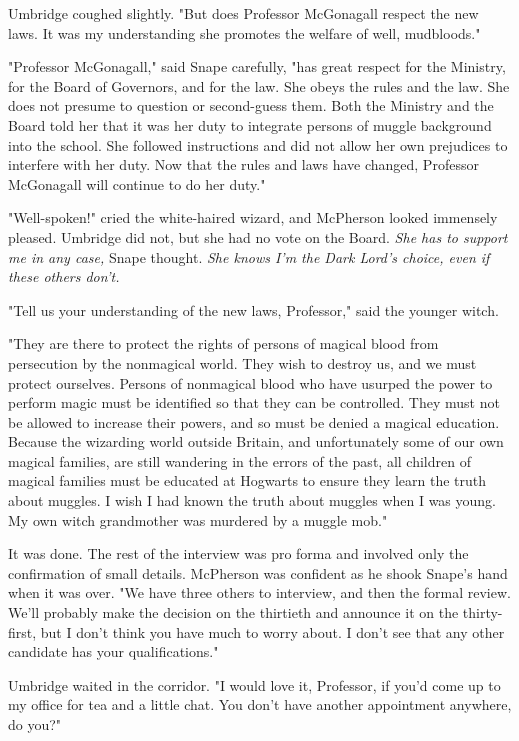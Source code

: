 Umbridge coughed slightly. "But does Professor McGonagall respect the new laws. It was my understanding she promotes the welfare of{\el} well, mudbloods."

"Professor McGonagall," said Snape carefully, "has great respect for the Ministry, for the Board of Governors, and for the law. She obeys the rules and the law. She does not presume to question or second-guess them. Both the Ministry and the Board told her that it was her duty to integrate persons of muggle background into the school. She followed instructions and did not allow her own prejudices to interfere with her duty. Now that the rules and laws have changed, Professor McGonagall will continue to do her duty."

"Well-spoken!" cried the white-haired wizard, and McPherson looked immensely pleased. Umbridge did not, but she had no vote on the Board. \emph{She has to support me in any case,} Snape thought. \emph{She knows I'm the Dark Lord's choice, even if these others don't.}

"Tell us your understanding of the new laws, Professor," said the younger witch.

"They are there to protect the rights of persons of magical blood from persecution by the nonmagical world. They wish to destroy us, and we must protect ourselves. Persons of nonmagical blood who have usurped the power to perform magic must be identified so that they can be controlled. They must not be allowed to increase their powers, and so must be denied a magical education. Because the wizarding world outside Britain, and unfortunately some of our own magical families, are still wandering in the errors of the past, all children of magical families must be educated at Hogwarts to ensure they learn the truth about muggles. I wish I had known the truth about muggles when I was young. My own witch grandmother was murdered by a muggle mob."

It was done. The rest of the interview was pro forma and involved only the confirmation of small details. McPherson was confident as he shook Snape's hand when it was over. "We have three others to interview, and then the formal review. We'll probably make the decision on the thirtieth and announce it on the thirty-first, but I don't think you have much to worry about. I don't see that any other candidate has your qualifications."

Umbridge waited in the corridor. "I would love it, Professor, if you'd come up to my office for tea and a little chat. You don't have another appointment anywhere, do you?"

